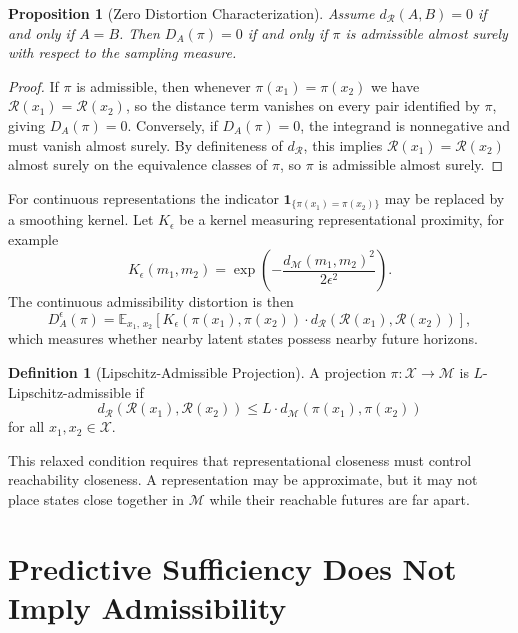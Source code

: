 \documentclass[12pt,a4paper]{article}
\theoremstyle{plain}
\newtheorem{proposition}{Proposition}
\theoremstyle{definition}
\newtheorem{definition}{Definition}
\theoremstyle{remark}
\begin{document}
\begin{proposition}[Zero Distortion Characterization]
Assume $d_{\mathcal{R}}(A, B) = 0$ if and only if $A = B$. Then $D_A(\pi) = 0$
if and only if $\pi$ is admissible almost surely with respect to the sampling
measure.
\end{proposition}

\begin{proof}
If $\pi$ is admissible, then whenever $\pi(x_1) = \pi(x_2)$ we have
$\mathcal{R}(x_1) = \mathcal{R}(x_2)$, so the distance term vanishes on every
pair identified by $\pi$, giving $D_A(\pi) = 0$. Conversely, if $D_A(\pi) = 0$,
the integrand is nonnegative and must vanish almost surely. By definiteness of
$d_{\mathcal{R}}$, this implies $\mathcal{R}(x_1) = \mathcal{R}(x_2)$ almost
surely on the equivalence classes of $\pi$, so $\pi$ is admissible almost
surely.
\end{proof}

For continuous representations the indicator $\mathbf{1}_{\{\pi(x_1) = \pi(x_2)\}}$
may be replaced by a smoothing kernel. Let $K_\epsilon$ be a kernel measuring
representational proximity, for example
\[
  K_\epsilon(m_1, m_2)
  =
  \exp\!\left(-\frac{d_{\mathcal{M}}(m_1, m_2)^2}{2\epsilon^2}\right).
\]
The continuous admissibility distortion is then
\[
  D_A^\epsilon(\pi)
  =
  \mathbb{E}_{x_1,\,x_2}
  \!\left[
    K_\epsilon\!\left(\pi(x_1), \pi(x_2)\right)
    \cdot
    d_{\mathcal{R}}\!\left(\mathcal{R}(x_1), \mathcal{R}(x_2)\right)
  \right],
\]
which measures whether nearby latent states possess nearby future horizons.

\begin{definition}[Lipschitz-Admissible Projection]
A projection $\pi : \mathcal{X} \to \mathcal{M}$ is $L$-Lipschitz-admissible if
\[
  d_{\mathcal{R}}\!\left(\mathcal{R}(x_1), \mathcal{R}(x_2)\right)
  \leq
  L \cdot d_{\mathcal{M}}\!\left(\pi(x_1), \pi(x_2)\right)
\]
for all $x_1, x_2 \in \mathcal{X}$.
\end{definition}

This relaxed condition requires that representational closeness must control
reachability closeness. A representation may be approximate, but it may not
place states close together in $\mathcal{M}$ while their reachable futures are
far apart.

\section{Predictive Sufficiency Does Not Imply Admissibility}
\end{document}
